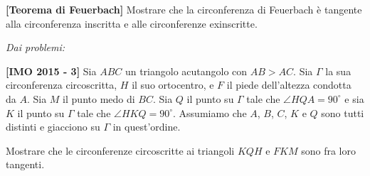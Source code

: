 \begin{itemize}
\textbf{[Teorema di Feuerbach]} Mostrare che la circonferenza di Feuerbach è tangente alla circonferenza inscritta e alle circonferenze exinscritte.


\emph{Dai problemi:}

\textbf{[IMO 2015 - 3]} Sia $ABC$ un triangolo acutangolo con $AB > AC$. Sia $\Gamma$ la sua circonferenza circoscritta, $H$ il suo ortocentro, e $F$ il piede dell'altezza condotta da $A$. Sia $M$ il punto medo di $BC$. Sia $Q$ il punto su $\Gamma$ tale che $\angle HQA = 90^{\circ}$ e sia $K$ il punto su $\Gamma$ tale che $\angle HKQ = 90^{\circ}$. Assumiamo che $A$, $B$, $C$, $K$ e $Q$ sono tutti distinti e giacciono su $\Gamma$ in quest'ordine. 

Mostrare che le circonferenze circoscritte ai triangoli $KQH$ e $FKM$ sono fra loro tangenti.






	
\end{itemize}
\clearpage

 








